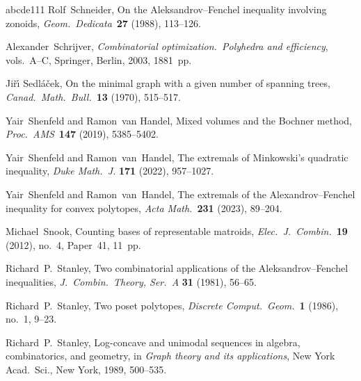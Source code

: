 \documentclass[11pt]{amsart}
\theoremstyle{definition}
\numberwithin{figure}{section}
\numberwithin{equation}{section}
\begin{document}
{\begin{thebibliography}{abcde111}
Rolf~Schneider,
On the Aleksandrov--Fenchel inequality involving zonoids,
\emph{Geom.\ Dedicata}~\textbf{27} (1988), 113--126.

Alexander~Schrijver, \emph{Combinatorial optimization.\ Polyhedra and efficiency},
vols.~A--C, Springer, Berlin, 2003, 1881~pp.

Ji\v{r}\'{\i} Sedl\'{a}\v{c}ek,
On the minimal graph with a given number of spanning trees,
\emph{Canad.\ Math.\ Bull.}~\textbf{13} (1970), 515--517.

%

Yair~Shenfeld and Ramon~van Handel,
Mixed volumes and the Bochner method,
\emph{Proc.\ AMS}~\textbf{147} (2019), 5385--5402.

Yair~Shenfeld and Ramon~van~Handel,
The extremals of Minkowski's quadratic inequality,
\emph{Duke Math.~J.} \textbf{171} (2022), 957--1027.

Yair~Shenfeld and Ramon~van~Handel,
The extremals of the Alexandrov--Fenchel inequality for convex polytopes,
\emph{Acta Math.}~\textbf{231} (2023), 89--204.

Michael~Snook, Counting bases of representable matroids,
\emph{Elec.\ J.\ Combin.}~\textbf{19} (2012), no.~4, Paper~41, 11~pp.

Richard~P.~Stanley,
Two combinatorial applications of the Aleksandrov--Fenchel inequalities,
\emph{J.\ Combin.\ Theory, Ser.~A} \textbf{31}  (1981), 56--65.

Richard~P.~Stanley, Two poset polytopes,
\emph{Discrete Comput.\ Geom.}~\textbf{1} (1986), no.~1, 9--23.

Richard~P.~Stanley,
Log-concave and unimodal sequences in algebra, combinatorics, and geometry,
in  \emph{Graph theory and its applications}, New York Acad.\ Sci.,
New York, 1989, 500--535.



\end{thebibliography}}
\end{document}
